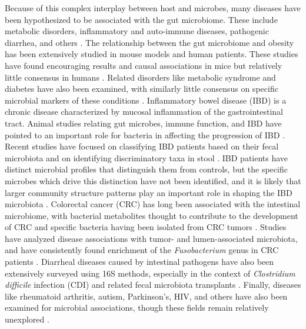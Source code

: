 \documentclass[12pt]{article}
\begin{document}
Because of this complex interplay between host and microbes, many 
diseases have been hypothesized to be associated with the gut 
microbiome. These include metabolic disorders,
inflammatory and auto-immune diseases, pathogenic diarrhea, and others \cite{nash-baker, turnbaugh-energy_harvest-2006, edd-singh, par-schep}.
The relationship between the gut microbiome and obesity has been 
extensively studied in mouse models and human patients. These studies
have found encouraging results and causal associations in mice but 
relatively little consensus in humans \cite{turnbaugh-energy_harvest-2006, ridaura-mouse_fmt-2013, ob-escobar, walters-ob_meta-2014}. 
Related disorders like metabolic 
syndrome and diabetes have also been examined, with similarly little consensus on
specific microbial markers of these conditions \cite{mets-stad, ob-ross}. 
Inflammatory bowel disease (IBD) is a chronic disease characterized by 
mucosal inflammation of the gastrointestinal tract. Animal studies relating gut 
microbes, immune function, and IBD have pointed to an important role for 
bacteria in affecting the progression of IBD \cite{tamboli-ibd-2004}. 
Recent studies have focused on classifying IBD patients based on 
their fecal microbiota and on identifying discriminatory taxa in stool 
\cite{ibd-papa, ibd-gevers}. IBD patients have distinct microbial profiles 
that distinguish them from controls, but the specific microbes which
drive this distinction have not been identified, and it is likely that
larger community structure patterns play an important role in shaping
the IBD microbiota \cite{walters-ob_meta-2014, ibd-papa, ibd-gevers}.
Colorectal cancer (CRC) has long been associated with the intestinal 
microbiome, with bacterial metabolites thought to contribute to the 
development of CRC and specific bacteria having been isolated from CRC 
tumors \cite{crc_zeller, crc_xiang}. Studies have analyzed disease associations with 
tumor- and lumen-associated microbiota, and have consistently found 
enrichment of the \textit{Fusobacterium} genus in CRC patients
\cite{crc_zeller, crc_zhao, crc_zhu, crc_zackular}. 
Diarrheal diseases caused by intestinal pathogens have also been extensively 
surveyed using 16S methods, especially in the context of 
\textit{Clostridium difficile} infection (CDI) and related fecal 
microbiota transplants \cite{cdi_schubert, cdi_vincent}. Finally, diseases like rheumatoid 
arthritis, autism, Parkinson's, HIV, and others have also been 
examined for microbial associations, though these fields remain 
relatively unexplored \cite{asd-kb, par-schep, ra-littman, hiv-dinh}.
\end{document}
